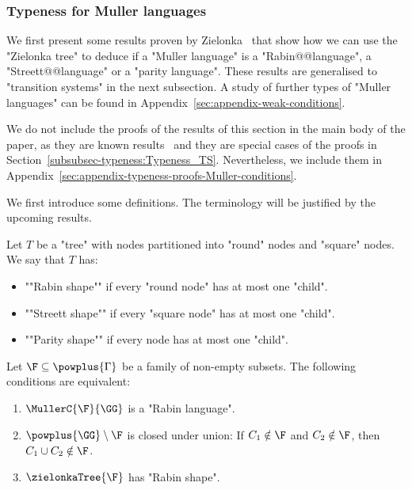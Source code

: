 \documentclass[10pt,a4paper]{amsart}
\begin{document}
\subsubsection{Typeness for Muller languages}\label{subsubsec-typeness:Typeness_Conditions}

We first present some results proven by Zielonka~\cite[Section~5]{Zielonka1998infinite} that show how we can use the "Zielonka tree" to deduce if a "Muller language" is a "Rabin@@language", a "Streett@@language" or a "parity language". These results are generalised to "transition systems" in the next subsection. A study of further types of "Muller languages" can be found in Appendix~\ref{sec:appendix-weak-conditions}.

We do not include the proofs of the results of this section in the main body of the paper, as they are known results~\cite[Section~5]{Zielonka1998infinite} and they are special cases of the proofs in Section~\ref{subsubsec-typeness:Typeness_TS}. Nevertheless, we include them in Appendix~\ref{sec:appendix-typeness-proofs-Muller-conditions}.

We first introduce some definitions. The terminology will be justified by the upcoming results.

\begin{definition}\label{def:ShapesOfTrees}
	Let $T$ be a "tree" with nodes partitioned into "round" nodes and "square" nodes. We say that $T$ has:
	\begin{itemize}
		\item  \AP""Rabin shape"" if every "round node" has at most one "child".
		
		\item  \AP""Streett shape"" if every "square node" has at most one "child".
		
		\item  \AP""Parity shape"" if every node has at most one "child".
	\end{itemize}
\end{definition}


\begin{proposition}\label{prop-typ:RabinZielonkaShape}
	Let $\F\subseteq \powplus{\Gamma}$ be a family of non-empty subsets. The following conditions are equivalent:
	\begin{enumerate}
		\item $\MullerC{\F}{\GG}$ is a "Rabin language".
		\item $\powplus{\GG}\setminus \F$ is closed under union: If %
		$C_1\notin \F$ and $C_2\notin \F$, then $C_1\cup C_2\notin\F$.
		\item $\zielonkaTree{\F}$ has "Rabin shape". 
	\end{enumerate}
\end{proposition}
\end{document}
